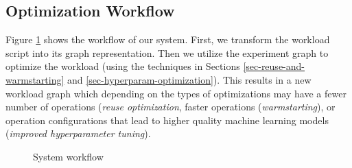 \subsection{Optimization Workflow}
Figure \ref{fig-system-workflow} shows the workflow of our system.
First, we transform the workload script into its graph representation.
Then we utilize the experiment graph to optimize the workload (using the techniques in Sections \ref{sec-reuse-and-warmstarting} and \ref{sec-hyperparam-optimization}).
This results in a new workload graph which depending on the types of optimizations may have a fewer number of operations (\textit{reuse optimization}, faster operations (\textit{warmstarting}), or operation configurations that lead to higher quality machine learning models (\textit{improved hyperparameter tuning}).
\begin{figure}
\centering

\caption{System workflow}
\label{fig-system-workflow}
\end{figure}
